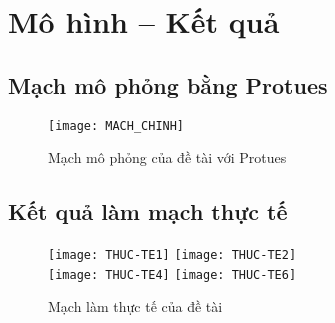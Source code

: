 \chapter{Mô hình -- Kết quả}
\section{Mạch mô phỏng bằng Protues}
\begin{figure}[h]
\begin{center}
\texttt{[image: MACH\_CHINH]}
\end{center}
\caption{Mạch mô phỏng của đề tài với Protues}
\end{figure}
\newpage
\section{Kết quả làm mạch thực tế}
\begin{figure}[!h]
\begin{center}
\texttt{[image: THUC-TE1]}
\texttt{[image: THUC-TE2]}\\
\texttt{[image: THUC-TE4]}
\texttt{[image: THUC-TE6]}
\end{center}
\caption{Mạch làm thực tế của đề tài}
\end{figure}